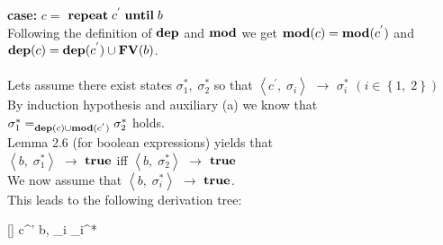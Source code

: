 \documentclass[12pt]{scrartcl}
\newcommand{\eState}[2]{$\left\langle \text{#1},\; \text{#2}\right\rangle$}
\newcommand{\eRule}[3]{\eState{#1}{#2} $\rightarrow$ #3}
\newcommand{\Mod}[0]{\text{\textbf{mod}}}
\newcommand{\dep}[0]{\text{\textbf{dep}}}
\newcommand{\FV}[0]{\text{\textbf{FV}}}
\begin{document}
	\indent \textbf{case:} $c=$ {\boldmath $\text{\textbf{repeat}}\; c ^{'}\; \text{\textbf{until}}\; b$}\\
	
	\indent\indent Following the definition of $\dep$ and $\Mod$ we get $\Mod(c)=\Mod(c^{'})$ and\\\indent\indent $\dep(c)=\dep(c^{'})\cup\FV(b)$.\\\\
	\indent\indent Lets assume there exist states $\sigma_{1}^{*},\;\sigma_{2}^{*}$ so that \eRule{$c^{'}$}{$\sigma_{i}$}{$\sigma_{i}^{*}$} \quad $\left(i\in\left\lbrace 1,\;2\right\rbrace\right)$\\
	\indent\indent By induction hypothesis and auxiliary (a) we know that\\\indent\indent $\sigma_{1}^{*}=_{\dep(c)\cup\Mod(c^{'})}\sigma_{2}^{*}$ holds.\\
	\indent\indent Lemma 2.6 (for boolean expressions) yields that\\\indent\indent \eRule{$b$}{$\sigma_{1}^{*}$}{$\text{\textbf{true}}$} iff \eRule{$b$}{$\sigma_{2}^{*}$}{$\text{\textbf{true}}$}\\
	
	\indent\indent We now assume that \eRule{$b$}{$\sigma_{i}^{*}$}{$\text{\textbf{true}}$}.\\
	\indent\indent This leads to the following derivation tree:
	\begin{center}
		\begin{prooftree}
			[]{\left\langle {}\; c^{'}\; \; b, \sigma_{i} \right\rangle \rightarrow \sigma_{i}^{*}}
		\end{prooftree}
	\end{center}
	
\end{document}
